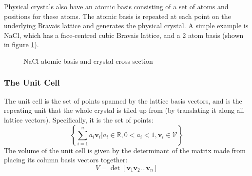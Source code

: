 \documentclass[12pt]{article}
\begin{document}
Physical crystals also have an atomic basis consisting of a set of atoms and positions for these atoms. The atomic basis is repeated at each point on the underlying Bravais lattice and generates the physical crystal. 
A simple example is NaCl, which has a face-centred cubic Bravais lattice, and a 2 atom basis (shown in figure \ref{fig:nacl_lattice}).
\begin{figure}[t!]
    \centering
    \qquad
    \qquad
    \caption{NaCl atomic basis and crystal cross-section}
\label{fig:nacl_lattice}
\end{figure}
\subsubsection{The Unit Cell}
The unit cell is the set of points spanned by the lattice basis vectors, and is the repeating unit that the whole crystal is tiled up from (by translating it along all lattice vectors). Specifically, it is the set of points:
\begin{equation}\label{eq:unit_cell}
	\left\{\sum _{i=1}^n a_i \mathbf v_i \Big| a_i \in \mathbb{R}, 0<a_i<1, \mathbf{v}_i \in \mathcal V \right\}
\end{equation}
The volume of the unit cell is given by the determinant of the matrix made from placing its column basis vectors together:
\begin{equation}
	V = \det [\mathbf{v}_1 \mathbf{v}_2 ... \mathbf{v}_n]
\end{equation}
\end{document}
